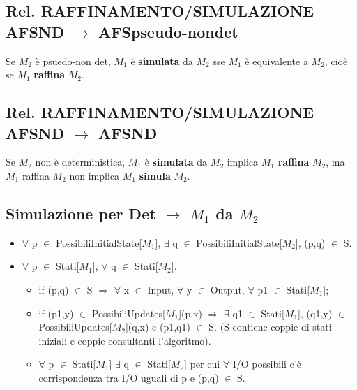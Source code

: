 \documentclass[a4paper]{article}
\begin{document}
\subsection{Rel. RAFFINAMENTO/SIMULAZIONE AFSND $\rightarrow$ AFSpseudo-nondet} Se $M_2$ è psuedo-non det, $M_1$ è \textbf{simulata} da $M_2$ sse $M_1$ è equivalente a $M_2$, cioè se $M_1$ \textbf{raffina} $M_2$.
\subsection{Rel. RAFFINAMENTO/SIMULAZIONE AFSND $\rightarrow$ AFSND} Se $M_2$ non è deterministica, $M_1$ è \textbf{simulata} da $M_2$ implica $M_1$ \textbf{raffina} $M_2$, ma $M_1$ raffina $M_2$ non implica $M_1$ \textbf{simula} $M_2$.
\subsection{Simulazione per Det $\rightarrow$ $M_1$ da $M_2$}
\begin{itemize}
\item $\forall$ p $\in$  PossibiliInitialState[$M_1$], $\exists$ q $\in$ PossibiliInitialState[$M_2$], (p,q) $\in$ S.
\item $\forall$ p $\in$  Stati[$M_1$], $\forall$ q $\in$ Stati[$M_2$].
\begin{itemize}
\item if (p,q) $\in$ S $\Rightarrow$ $\forall$ x $\in$ Input, $\forall$ y $\in$ Output, $\forall$ p1 $\in$  Stati[$M_1$];
\item if (p1,y) $\in$ PossibiliUpdates[$M_1$](p,x) $\Rightarrow$ $\exists$ q1 $\in$ Stati[$M_1$], (q1,y) $\in$ PossibiliUpdates[$M_2$](q,x) e (p1,q1) $\in$ S. (S contiene coppie di stati iniziali e coppie consultanti l'algoritmo).
\item $\forall$ p $\in$ Stati[$M_1$] $\exists$ q $\in$ Stati[$M_2$] per cui $\forall$ I/O possibili c'è corrispondenza tra I/O uguali di p e (p,q) $\in$ S. 
\end{itemize}
\end{itemize}
\end{document}
